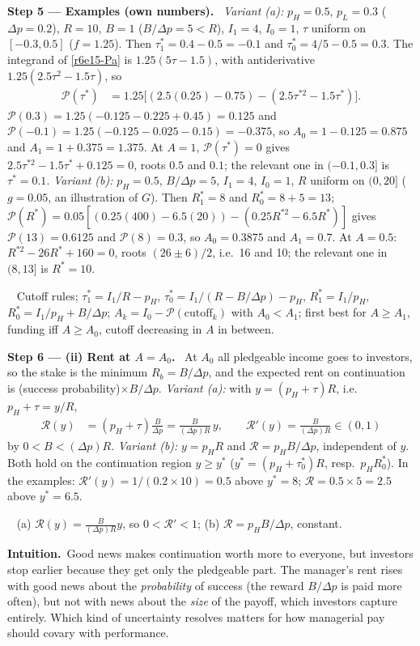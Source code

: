 \documentclass[11pt,a4paper]{article}
\newcommand{\step}[2]{\par\medskip\noindent\textbf{Step #1 --- #2.}~}
\newcommand{\intuition}{\par\medskip\noindent\textbf{Intuition.}~}
\newcommand{\answer}[1]{\par\smallskip\noindent\fbox{\textbf{Answer #1.}}~}
\begin{document}
\step{5}{Examples (own numbers)} \emph{Variant (a):} $p_H=0.5$, $p_L=0.3$ ($\Delta p=0.2$), $R=10$, $B=1$ ($B/\Delta p=5<R$), $I_1=4$, $I_0=1$, $\tau$ uniform on $[-0.3,0.5]$ ($f=1.25$). Then $\tau_1^*=0.4-0.5=-0.1$ and $\tau_0^*=4/5-0.5=0.3$. The integrand of \eqref{r6e15-Pa} is $1.25(5\tau-1.5)$, with antiderivative $1.25(2.5\tau^2-1.5\tau)$, so
\begin{align}
  \mathcal P(\tau^*) &= 1.25\big[(2.5(0.25)-0.75)-(2.5\tau^{*2}-1.5\tau^*)\big]. \nonumber
\end{align}
$\mathcal P(0.3)=1.25(-0.125-0.225+0.45)=0.125$ and $\mathcal P(-0.1)=1.25(-0.125-0.025-0.15)=-0.375$, so $A_0=1-0.125=0.875$ and $A_1=1+0.375=1.375$. At $A=1$, $\mathcal P(\tau^*)=0$ gives $2.5\tau^{*2}-1.5\tau^*+0.125=0$, roots $0.5$ and $0.1$; the relevant one in $(-0.1,0.3]$ is $\tau^*=0.1$.
\emph{Variant (b):} $p_H=0.5$, $B/\Delta p=5$, $I_1=4$, $I_0=1$, $R$ uniform on $(0,20]$ ($g=0.05$, an illustration of $G$). Then $R_1^*=8$ and $R_0^*=8+5=13$; $\mathcal P(R^*)=0.05[(0.25(400)-6.5(20))-(0.25R^{*2}-6.5R^*)]$ gives $\mathcal P(13)=0.6125$ and $\mathcal P(8)=0.3$, so $A_0=0.3875$ and $A_1=0.7$. At $A=0.5$: $R^{*2}-26R^*+160=0$, roots $(26\pm6)/2$, i.e.\ 16 and 10; the relevant one in $(8,13]$ is $R^*=10$.
\answer{(i)} Cutoff rules; $\tau_1^*=I_1/R-p_H$, $\tau_0^*=I_1/(R-B/\Delta p)-p_H$, $R_1^*=I_1/p_H$, $R_0^*=I_1/p_H+B/\Delta p$; $A_k=I_0-\mathcal P(\text{cutoff}_k)$ with $A_0<A_1$; first best for $A\ge A_1$, funding iff $A\ge A_0$, cutoff decreasing in $A$ in between.

\step{6}{(ii) Rent at $A=A_0$} At $A_0$ all pledgeable income goes to investors, so the stake is the minimum $R_b=B/\Delta p$, and the expected rent on continuation is (success probability)$\times B/\Delta p$. \emph{Variant (a):} with $y=(p_H+\tau)R$, i.e.\ $p_H+\tau=y/R$,
\begin{align}
  \mathcal R(y) &= (p_H+\tau)\frac{B}{\Delta p} = \frac{B}{(\Delta p)R}\,y, \qquad \mathcal R'(y)=\frac{B}{(\Delta p)R}\in(0,1) \label{r6e15-Ra}
\end{align}
by $0<B<(\Delta p)R$. \emph{Variant (b):} $y=p_HR$ and $\mathcal R=p_HB/\Delta p$, independent of $y$. Both hold on the continuation region $y\ge y^*$ ($y^*=(p_H+\tau_0^*)R$, resp.\ $p_HR_0^*$). In the examples: $\mathcal R'(y)=1/(0.2\times10)=0.5$ above $y^*=8$; $\mathcal R=0.5\times5=2.5$ above $y^*=6.5$.
\answer{(ii)} (a) $\mathcal R(y)=\frac{B}{(\Delta p)R}y$, so $0<\mathcal R'<1$; (b) $\mathcal R=p_HB/\Delta p$, constant.

\intuition Good news makes continuation worth more to everyone, but investors stop earlier because they get only the pledgeable part. The manager's rent rises with good news about the \emph{probability} of success (the reward $B/\Delta p$ is paid more often), but not with news about the \emph{size} of the payoff, which investors capture entirely. Which kind of uncertainty resolves matters for how managerial pay should covary with performance.
\end{document}
